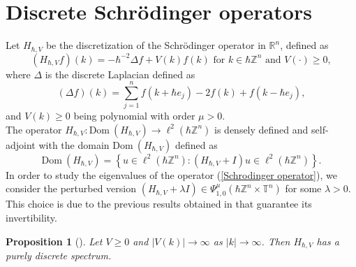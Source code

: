 \documentclass[pdflatex,sn-mathphys-num]{sn-jnl}%
\theoremstyle{thmstyleone}%
\newtheorem{proposition}[theorem]{Proposition}
\theoremstyle{thmstyletwo}%
\theoremstyle{thmstylethree}%
\begin{document}
\section{Discrete Schrödinger operators}\label{section applications}
Let $H_{\hbar,V}$ be the discretization of the  Schrödinger operator in $\mathbb{R}^n$, defined as
\begin{equation}\label{Schrodinger operator}
(H_{\hbar,V}f)(k)=-\hbar^{-2}\Delta f+ V(k)f(k) \text{  for } k\in\hbar\mathbb{Z}^n \text{ and } V(\cdot)\geq0,
\end{equation}
where $\Delta$ is the discrete Laplacian defined as 
\[ (\Delta f)(k)=\sum_{j=1}^{n}f(k+\hbar e_j)-2f(k)+f(k-\hbar e_j),   \]
and $V(k)\geq 0$ being polynomial with order $\mu>0$.\\
\indent The operator $H_{\hbar,V}: \text{Dom}\ (H_{\hbar,V})\to \ell^2(\hbar\mathbb{Z}^n)$ is densely defined and self-adjoint with the domain $\text{Dom}\ (H_{\hbar,V})$ defined as
\[\text{Dom}\ (H_{\hbar,V})=\left\{u\in\ell^2(\hbar\mathbb{Z}^n): (H_{\hbar,V}+I)u\in \ell^2(\hbar\mathbb{Z}^n) \right\}. \]
\noindent In order to study the eigenvalues of the operator (\ref{Schrodinger operator}), we consider the perturbed version $(H_{\hbar,V}+\lambda I)\in \Psi^\mu_{1,0}(\hbar\mathbb{Z}^n\times\mathbb{T}^n) $ for some $\lambda>0$. This choice is due to the previous results obtained in \cite{dasgupta2023discrete} that guarantee its invertibility.

\begin{proposition}[\cite{dasgupta2023discrete}]
    Let $V\geq 0$ and $|V(k)|\to \infty$ as $|k|\to\infty$. Then $H_{\hbar,V}$ has a purely discrete spectrum. 
\end{proposition}
\end{document}
